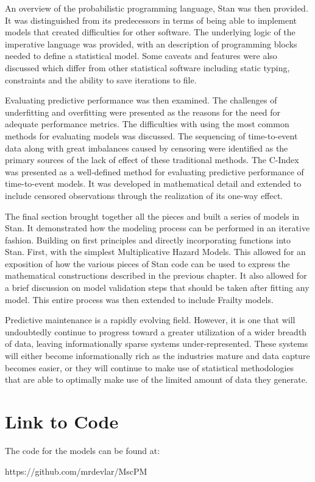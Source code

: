 An overview of the probabilistic programming language, Stan was then provided. It was distinguished from its predecessors in terms of being able to implement models that created difficulties for other software. The underlying logic of the imperative  language was provided, with an description of programming blocks needed to define a statistical model. Some caveats and features were also discussed which differ from other statistical software including static typing, constraints and the ability to save iterations to file.

Evaluating predictive performance was then examined. The challenges of underfitting and overfitting were presented as the reasons for the need for adequate performance metrics. The difficulties with using the most common methods for evaluating models was discussed. The sequencing of time-to-event data along with great imbalances caused by censoring were identified as the primary sources of the lack of effect of these traditional methods. The C-Index was presented as a well-defined method for evaluating predictive performance of time-to-event models. It was developed in mathematical detail and extended to include censored observations through the realization of its one-way effect.

The final section brought together all the pieces and built a series of models in Stan. It demonstrated how the modeling process can be performed in an iterative fashion. Building on first principles and directly incorporating functions into Stan. First, with the simplest Multiplicative Hazard Models. This allowed for an exposition of how the various pieces of Stan code can be used to express the mathematical constructions described in the previous chapter. It also allowed for a brief discussion on model validation steps that should be taken after fitting any model. This entire process was then extended to include Frailty models. 

Predictive maintenance is a rapidly evolving field. However, it is one that will undoubtedly continue to progress toward a greater utilization of a wider breadth of data, leaving informationally sparse systems under-represented. These systems will either become informationally rich as the industries mature and data capture becomes easier, or they will continue to make use of statistical methodologies that are able to optimally make use of the limited amount of data they generate.







\section*{Link to Code}


The code for the models can be found at:

https://github.com/mrdevlar/MscPM